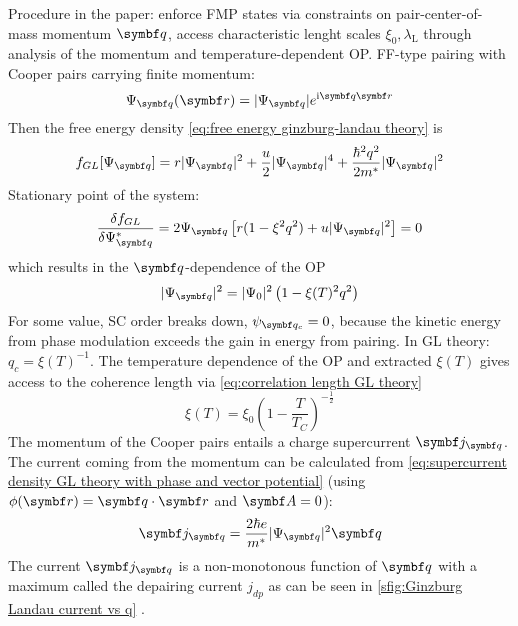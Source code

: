 \documentclass[../notes.tex]{subfiles}
\begin{document}
Procedure in the paper: enforce FMP states via constraints on pair-center-of-mass momentum \(\vb{q}\), access characteristic lenght scales \(\xi_0, \lambda_{\mathrm{L}}\) through analysis of the momentum and temperature-dependent OP\@.
FF-type pairing with Cooper pairs carrying finite momentum:
\begin{equation}
	\Psi_{\vb{q}} (\vb{r}) = \vert \Psi_{\vb{q}} \vert e^{\iu \vb{q} \vb{r}}
\end{equation}
Then the free energy density \cref{eq:free energy ginzburg-landau theory} is
\begin{equation}
	f_{GL} [\Psi_{\vb{q}}] = r \vert \Psi_{\vb{q}} \vert^2 + \frac{u}{2} \vert \Psi_{\vb{q}} \vert^4 + \frac{\hbar^2 q^2}{2 m^*} \vert \Psi_{\vb{q}} \vert^2
\end{equation}
Stationary point of the system:
\begin{equation}
	\fdv{f_{GL}}{\Psi_{\vb{q}}^*} = 2 \Psi_{\vb{q}} \left[r (1 - \xi^2 q^2) + u \vert \Psi_{\vb{q}} \vert^2\right] = 0
\end{equation}
which results in the \(\vb{q}\)-dependence of the OP
\begin{equation}
	\vert \Psi_{\vb{q}} \vert^2 = \vert \Psi_{0} \vert^2 \left(1 - \xi(T)^2 q^2\right)
\end{equation}
For some value, SC order breaks down, \(\psi_{\vb{q}_c} = 0\), because the kinetic energy from phase modulation exceeds the gain in energy from pairing.
In GL theory: \(q_c = \xi(T)^{-1}\).
The temperature dependence of the OP and extracted \(\xi(T)\) gives access to the coherence length via \cref{eq:correlation length GL theory}
\begin{equation}
	\xi(T) = \xi_0 \left(1 - \frac{T}{T_C}\right)^{-\frac{1}{2}}
\end{equation}
The momentum of the Cooper pairs entails a charge supercurrent \(\vb{j}_{\vb{q}}\).
The current coming from the momentum can be calculated from \cref{eq:supercurrent density GL theory with phase and vector potential} (using \(\phi(\vb{r}) = \vb{q} \cdot \vb{r}\) and \(\vb{A} = 0\)):
\begin{equation}
	\vb{j}_{\vb{q}} = \frac{2 \hbar e}{m^*} \vert \Psi_{\vb{q}} \vert^2 \vb{q}
\end{equation}
The current \(\vb{j}_{\vb{q}}\) is a non-monotonous function of \(\vb{q}\) with a maximum called the depairing current \(j_{dp}\) as can be seen in \cref{sfig:Ginzburg Landau current vs q} .
\end{document}
